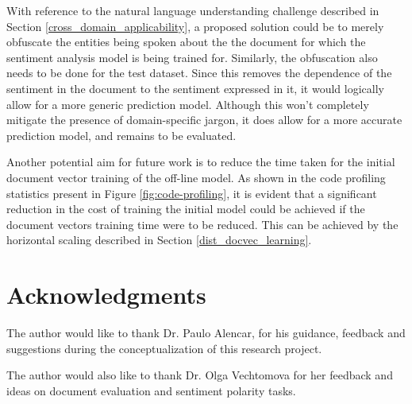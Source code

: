 \documentclass[conference]{IEEEtran}
\begin{document}
    With reference to the natural language understanding challenge described in Section \ref{cross_domain_applicability}, a proposed solution could be to merely obfuscate the entities being spoken about the the document for which the sentiment analysis model is being trained for. 
    Similarly, the obfuscation also needs to be done for the test dataset. 
    Since this removes the dependence of the sentiment in the document to the sentiment expressed in it, it would logically allow for a more generic prediction model. 
    Although this won't completely mitigate the presence of domain-specific jargon, it does allow for a more accurate prediction model, and remains to be evaluated.

    Another potential aim for future work is to reduce the time taken for the initial document vector training of the off-line model.
    As shown in the code profiling statistics present in Figure \ref{fig:code-profiling}, it is evident that a significant reduction in the cost of training the initial model could be achieved if the document vectors training time were to be reduced. 
    This can be achieved by the horizontal scaling described in Section \ref{dist_docvec_learning}.

\vspace{5mm}

\section{Acknowledgments}
    The author would like to thank Dr. Paulo Alencar, for his guidance, feedback and suggestions during the conceptualization of this research project. 

    The author would also like to thank Dr. Olga Vechtomova for her feedback and ideas on document evaluation and sentiment polarity tasks.

\vspace{5mm}


\balance

\end{document}
